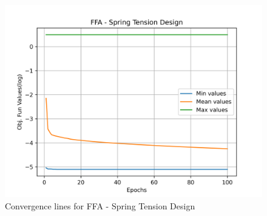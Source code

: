 \begin{figure}[H]
\centering
\caption{Convergence lines for FFA - Spring Tension Design}
\label{fig:spring_problem_solve_ffa}
\includegraphics[scale=0.5]{images/spring_problem_solve_ffa.png}
\end{figure}
        
